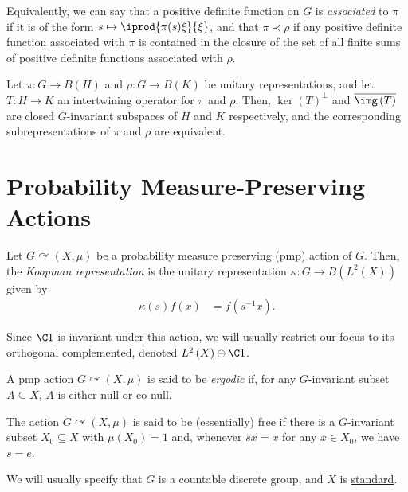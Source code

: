 \documentclass[10pt]{mypackage}
\begin{document}
Equivalently, we can say that a positive definite function on $G$ is \textit{associated} to $\pi$ if it is of the form $s\mapsto \iprod{\pi(s)\xi}{\xi}$, and that $\pi\prec \rho$ if any positive definite function associated with $\pi$ is contained in the closure of the set of all finite sums of positive definite functions associated with $\rho$.
\begin{lemma}
  Let $\pi\colon G\rightarrow B\left( H \right)$ and $\rho\colon G\rightarrow B\left( K \right)$ be unitary representations, and let $T\colon H\rightarrow K$ an intertwining operator for $\pi$ and $\rho$. Then, $ \ker\left( T \right)^{\perp} $ and $ \overline{\img\left( T \right)} $ are closed $G$-invariant subspaces of $H$ and $K$ respectively, and the corresponding subrepresentations of $\pi$ and $\rho$ are equivalent.
\end{lemma}
\section{Probability Measure-Preserving Actions}%
\begin{definition}
  Let $G\curvearrowright \left( X,\mu \right)$ be a probability measure preserving (pmp) action of $G$. Then, the \textit{Koopman representation} is the unitary representation $\kappa\colon G\rightarrow B\left( L^2\left( X \right) \right)$ given by
  \begin{align*}
    \kappa\left( s \right)f(x) &= f\left( s^{-1}x \right).
  \end{align*}
\end{definition}
Since $\C 1$ is invariant under this action, we will usually restrict our focus to its orthogonal complemented, denoted $L^2\left( X \right)\ominus \C 1$.
\begin{definition}
  A pmp action $G\curvearrowright \left( X,\mu \right)$ is said to be \textit{ergodic} if, for any $G$-invariant subset $A\subseteq X$, $A$ is either null or co-null.
\end{definition}
\begin{definition}
  The action $G\curvearrowright \left( X,\mu \right)$ is said to be (essentially) free if there is a $G$-invariant subset $X_0\subseteq X$ with $\mu\left( X_0 \right) = 1$ and, whenever $sx = x$ for any $x\in X_0$, we have $s = e$.
\end{definition}
We will usually specify that $G$ is a countable discrete group, and $X$ is \href{https://ai-bearing.github.io/Classes_and_Homework/After\%20College/Other\%20Notes/orbit_equivalence.pdf}{standard}.
\end{document}
